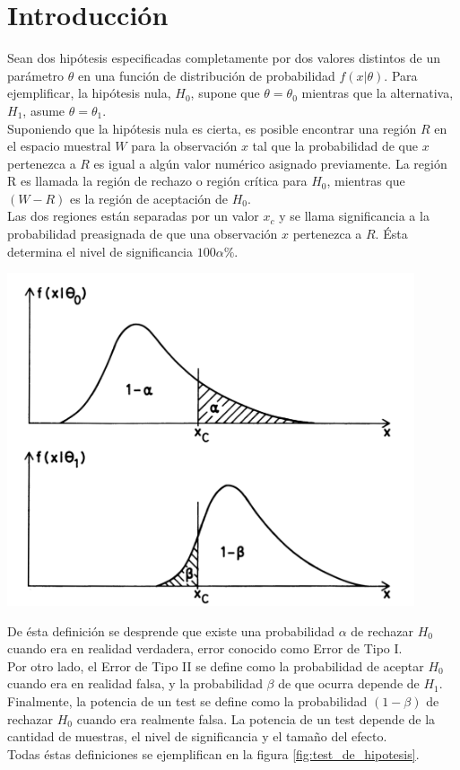 \documentclass[%
 reprint,
 amsmath,amssymb,
 aps,
spanish]{revtex4-1}
\begin{document}
\section{Introducción}
Sean dos hipótesis especificadas completamente por dos valores distintos de un parámetro $\theta$ en una función de distribución de probabilidad $f(x|\theta)$. 
Para ejemplificar, la hipótesis nula, $H_0$, supone que $\theta = \theta_0$ mientras que la alternativa, $H_1$, asume $\theta = \theta_1$. \\
Suponiendo que la hipótesis nula es cierta, es posible encontrar una región $R$ en el espacio muestral $W$ para la observación $x$ tal que la probabilidad de que $x$ pertenezca a $R$ es igual a algún 
valor numérico asignado previamente. La región R es llamada la región de rechazo o región crítica para $H_0$, mientras que $(W-R)$ es la región de aceptación de $H_0$.\\
Las dos regiones están separadas por un valor $x_c$ y se llama significancia a la probabilidad preasignada de que una observación $x$ pertenezca a $R$. Ésta determina el nivel de significancia 
$100\alpha\%$.\\
\begin{minipage}{0.45\textwidth}									
\centering
\includegraphics[width=0.9\textwidth]{imagenes/test_de_hipotesis}
\label{fig:test_de_hipotesis}
\end{minipage}

De ésta definición se desprende que existe una probabilidad $\alpha$ de rechazar $H_0$ cuando era en realidad verdadera, error conocido como Error de Tipo I.\\
Por otro lado, el Error de Tipo II se define como la probabilidad de aceptar $H_0$ cuando era en realidad falsa, y la probabilidad $\beta$ de que ocurra depende de $H_1$.\\
Finalmente, la potencia de un test se define como la probabilidad $(1-\beta)$ de rechazar $H_0$ cuando era realmente falsa. La potencia de un test depende de la cantidad de muestras, el nivel de 
significancia y el tamaño del efecto. \\ Todas éstas definiciones se ejemplifican en la figura \ref{fig:test_de_hipotesis}.\cite{frodesen}
\end{document}
